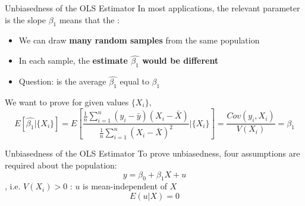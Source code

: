 \begin{frame}{Unbiasedness of the OLS Estimator}
In most applications, the relevant parameter is the slope $\beta_1$
\vfill
{} means that the 
\vfill
{}:
\begin{itemize}
\item We can draw \textbf{many random samples} from the same population
\item In each sample, the \textbf{estimate $\widehat{\beta_1}$ would be different}
\item Question: is the average $\widehat{\beta_1}$ equal to $\beta_1$
\end{itemize}
\pause
We want to prove for given values $\{X_i\}$, 
\begin{equation}
E[\hat{\beta_1}|\{X_i\}]=E\left[\frac{\frac{1}{n}\sum_{i=1}^n (y_i - \bar{y})(X_i-\bar{X})}{\frac{1}{n}\sum_{i=1}^n (X_i-\bar{X})^2} |\{X_i\} \right]=\frac{Cov(y_i, X_i)}{V(X_i)}=\beta_1
\label{eq22}
\end{equation}


\end{frame}


\begin{frame}{Unbiasedness of the OLS Estimator}
To prove unbiasedness, four assumptions are required about the population: 
\vfill
{}
\begin{equation}
y=\beta_0 + \beta_1 X + u
\label{eq23}
\end{equation}
\vfill
{}
\pause
\vfill
{}, i.e. $V(X_i)>0$
\vfill
{}: $u$ is mean-independent of $X$
\begin{equation}
E(u|X)=0
\label{eq23}
\end{equation}
\end{frame}


